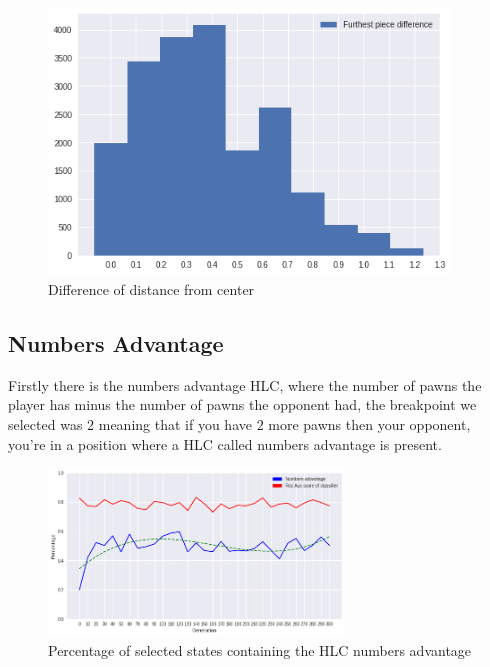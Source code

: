 \begin{figure}
    \begin{small}
        \begin{center}
            \includegraphics[width=0.95\textwidth]{graphics/dist_unity}
        \end{center}
        \caption{Difference of distance from center}
        \label{fig:dist_unity}
    \end{small}
\end{figure}








\subsection{Numbers Advantage}

Firstly there is the numbers advantage HLC, where the number of pawns the player has minus the number of pawns the opponent had, the breakpoint we selected was $2$ meaning that if you have $2$ more pawns then your opponent, you're in a position where a HLC called numbers advantage is present.

\begin{figure}[]
    \centering
    \includegraphics[width=0.7\textwidth]{graphics/number_pawns_trend}
    \caption{Percentage of selected states containing the HLC numbers advantage}
    \label{fig:numberadvantage}
\end{figure}

